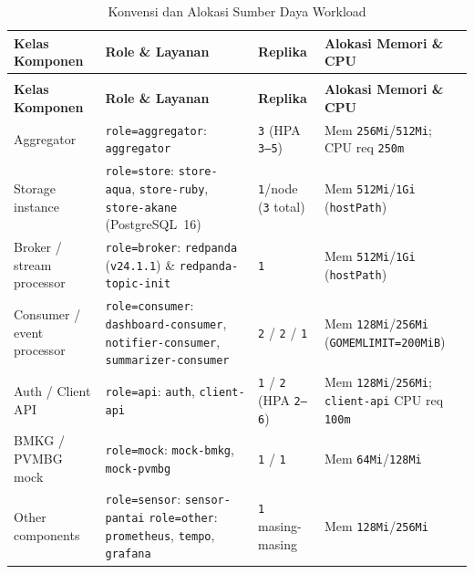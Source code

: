 {\footnotesize
\renewcommand{\arraystretch}{1.18}
\begin{spacing}{1.05}
\begin{xltabular}{\textwidth}{>{\raggedright\arraybackslash}p{3.4cm} >{\raggedright\arraybackslash}X >{\raggedright\arraybackslash}p{2.3cm} >{\raggedright\arraybackslash}p{3.7cm}}
\caption{Konvensi dan Alokasi Sumber Daya Workload} \label{tab:deklarasi_workload} \\
\toprule
\textbf{Kelas Komponen} & \textbf{Role \& Layanan} & \textbf{Replika} & \textbf{Alokasi Memori \& CPU} \\
\midrule
\endfirsthead

 \\
\toprule
\textbf{Kelas Komponen} & \textbf{Role \& Layanan} & \textbf{Replika} & \textbf{Alokasi Memori \& CPU} \\
\midrule
\endhead

\bottomrule
\endfoot

Aggregator &
\texttt{role=aggregator}: \texttt{aggregator} &
\texttt{3} (HPA \texttt{3--5}) &
Mem \texttt{256Mi}/\texttt{512Mi}; CPU req \texttt{250m} \\
\midrule
Storage instance &
\texttt{role=store}: \texttt{store-aqua}, \texttt{store-ruby}, \texttt{store-akane} (PostgreSQL~16) &
\texttt{1}/node (\texttt{3} total) &
Mem \texttt{512Mi}/\texttt{1Gi} (\texttt{hostPath}) \\
\midrule
Broker / stream processor &
\texttt{role=broker}: \texttt{redpanda} (\texttt{v24.1.1}) \& \texttt{redpanda-topic-init} &
\texttt{1} &
Mem \texttt{512Mi}/\texttt{1Gi} (\texttt{hostPath}) \\
\midrule
Consumer / event processor &
\texttt{role=consumer}: \texttt{dashboard-consumer}, \texttt{notifier-consumer}, \texttt{summarizer-consumer} &
\texttt{2} / \texttt{2} / \texttt{1} &
Mem \texttt{128Mi}/\texttt{256Mi} \newline (\texttt{GOMEMLIMIT=200MiB}) \\
\midrule
Auth / Client API &
\texttt{role=api}: \texttt{auth}, \texttt{client-api} &
\texttt{1} / \texttt{2} (HPA \texttt{2--6}) &
Mem \texttt{128Mi}/\texttt{256Mi}; \texttt{client-api} CPU req \texttt{100m} \\
\midrule
BMKG / PVMBG mock &
\texttt{role=mock}: \texttt{mock-bmkg}, \texttt{mock-pvmbg} &
\texttt{1} / \texttt{1} &
Mem \texttt{64Mi}/\texttt{128Mi} \\
\midrule
Other components &
\texttt{role=sensor}: \texttt{sensor-pantai} \newline \texttt{role=other}: \texttt{prometheus}, \texttt{tempo}, \texttt{grafana} &
\texttt{1} masing-masing &
Mem \texttt{128Mi}/\texttt{256Mi} \\
\end{xltabular}
\end{spacing}
}

